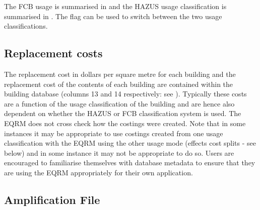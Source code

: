 The FCB usage is summarised in
 and the HAZUS usage
classification is summarised in
. The  flag
 can be used to switch between
the two usage classifications.


\subsection{Replacement costs}
\label{sec:grids-replacecosts}


The replacement cost in dollars per square metre for each building
and the replacement cost of the contents of each building are
contained within the building database
(columns 13 and 14 respectively: see ).
Typically these costs are a function of the usage classification
of the building and are hence also dependent on whether the
HAZUS or FCB classification system is used. The EQRM does not cross
check how the costings were created. Note that in some instances
it may be appropriate to use costings created from one usage
classification with the EQRM using the other usage mode (effects
cost splits - see below) and in some instance it may not be
appropriate to do so. Users are encouraged to familiarise
themselves with database metadata to ensure that they are using
the EQRM appropriately for their own application.




\subsection{Amplification File}
\label{sec:-appl-amplification}

 

